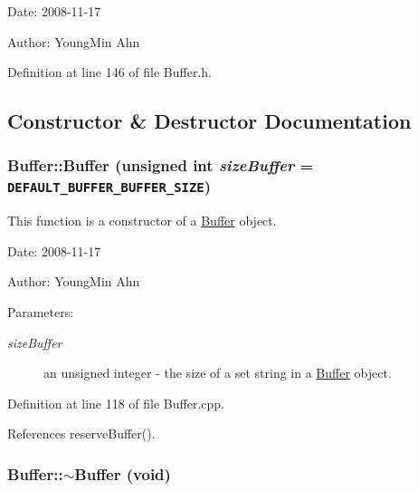 \begin{Desc}
\item[Date:]2008-11-17 \end{Desc}
\begin{Desc}
\item[Author:]YoungMin Ahn \end{Desc}


Definition at line 146 of file Buffer.h.

\subsection{Constructor \& Destructor Documentation}
\hypertarget{classkmaOrange_1_1Buffer_a8957deac57937576dd6693106ea824a}{
\subsubsection[{Buffer}]{\setlength{\rightskip}{0pt plus 5cm}Buffer::Buffer (unsigned int {\em sizeBuffer} = {\tt DEFAULT\_\-BUFFER\_\-BUFFER\_\-SIZE})}}
\label{classkmaOrange_1_1Buffer_a8957deac57937576dd6693106ea824a}


This function is a constructor of a \hyperlink{classkmaOrange_1_1Buffer}{Buffer} object. 

\begin{Desc}
\item[Date:]2008-11-17 \end{Desc}
\begin{Desc}
\item[Author:]YoungMin Ahn \end{Desc}
\begin{Desc}
\item[Parameters:]
\begin{description}
\item[{\em sizeBuffer}]an unsigned integer - the size of a set string in a \hyperlink{classkmaOrange_1_1Buffer}{Buffer} object. \end{description}
\end{Desc}


Definition at line 118 of file Buffer.cpp.

References reserveBuffer().\hypertarget{classkmaOrange_1_1Buffer_884ca5fae46e971a28b63b901b2330ae}{
\subsubsection[{$\sim$Buffer}]{\setlength{\rightskip}{0pt plus 5cm}Buffer::$\sim$Buffer (void)}}
\label{classkmaOrange_1_1Buffer_884ca5fae46e971a28b63b901b2330ae}


